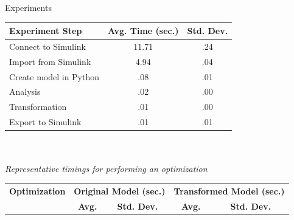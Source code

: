 \documentclass[final,hyperref={pdfpagelabels=false}]{beamer}
\begin{document}
\begin{frame}{}
\begin{columns}[t]
\begin{column}{.385\linewidth}
\begin{block}{Experiments}
\begin{table}[h]
             \centering
             \begin{tabular}{l | c c }
             
             \textbf{Experiment Step} & \textbf{Avg. Time (sec.)} & \textbf{Std. Dev.} \\\hline
              
             Connect to Simulink & 11.71 & .24 \\
             Import from Simulink & 4.94 & .04 \\
             Create model in Python & .08 & .01 \\
             Analysis & .02 & .00 \\
             Transformation & .01 & .00 \\
             Export to Simulink & .01 & .01 \\
             
             
             \end{tabular}
             ~\\~\\
             \footnotesize \textit{Representative timings for performing an optimization}
             \end{table}
             
             \begin{table}[h]
             
             \centering
             \begin{tabular}{l | c c c c }
             
             \textbf{Optimization} &\multicolumn{2}{c}{\textbf{Original Model (sec.)}}& \multicolumn{2}{c}{\textbf{Transformed Model (sec.)}} \\
              & \textbf{Avg.} & \textbf{Std. Dev.} & \textbf{Avg.} &\textbf{ Std. Dev.}\\\hline
              

\end{tabular}
\end{table}
\end{block}
\end{column}
\end{columns}
\end{frame}
\end{document}

